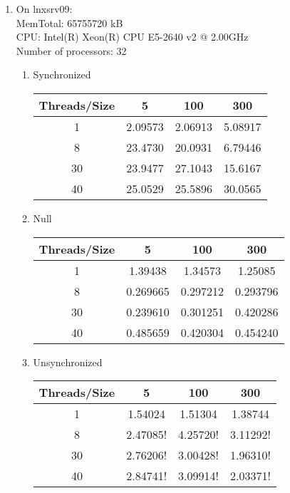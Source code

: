 \documentclass[letterpaper,twocolumn,10pt]{article}
\begin{document}
\begin{enumerate}
  \item   
  On lnxsrv09: \\
  MemTotal:       65755720 kB \\
  CPU: Intel(R) Xeon(R) CPU E5-2640 v2 @ 2.00GHz\\
  Number of processors: 32 \\
  \begin{enumerate}
    \item 
    Synchronized
    \begin{center}
      \begin{tabular}{|c|c|c|c|}
      \hline
        Threads/Size & 5 & 100 & 300 \\
      \hline 1 & 2.09573 & 2.06913 & 5.08917 \\
      \hline 8 & 23.4730 & 20.0931 & 6.79446 \\
      \hline 30 & 23.9477 & 27.1043 & 15.6167 \\
      \hline 40 & 25.0529 & 25.5896 & 30.0565 \\
      \hline
      \end{tabular}
    \end{center}
    \item 
    Null
    \begin{center}
      \begin{tabular}{|c|c|c|c|}
      \hline
        Threads/Size & 5 & 100 & 300 \\
      \hline 1 & 1.39438 & 1.34573 & 1.25085 \\
      \hline 8 & 0.269665 & 0.297212 & 0.293796 \\
      \hline 30 & 0.239610 & 0.301251 & 0.420286 \\
      \hline 40 & 0.485659 & 0.420304 & 0.454240 \\
      \hline
      \end{tabular}
    \end{center}
    \item 
    Unsynchronized
    \begin{center}
      \begin{tabular}{|c|c|c|c|}
      \hline
        Threads/Size & 5 & 100 & 300 \\
      \hline 1 & 1.54024 & 1.51304 & 1.38744 \\
      \hline 8 & 2.47085! & 4.25720! & 3.11292! \\
      \hline 30 & 2.76206! & 3.00428! & 1.96310! \\
      \hline 40 & 2.84741! & 3.09914! & 2.03371! \\

\end{tabular}
\end{center}
\end{enumerate}
\end{enumerate}
\end{document}
